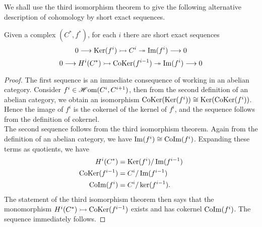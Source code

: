 \documentclass[a4paper]{article}
\def\mono{\rightarrowtail}
\def\epi{\twoheadrightarrow}
\begin{document}
We shall use the third isomorphism theorem to give the following alternative description of cohomology by short exact sequences.
\begin{Theorem}
    Given a complex $(C^*, f^*)$, for each $i$ there are short exact sequences
    \[
        0 \to \Ker(f^i) \mono C^{i} \epi \im(f^i) \to 0
    \]
    \begin{equation}\label{eqn:CoHomExact}
        0 \to H^i(C^*) \mono \CoKer(f^{i-1}) \epi \im(f^{i}) \to 0
    \end{equation}
\end{Theorem}
\begin{proof}
    The first sequence is an immediate consequence of working in an abelian category. Consider $f^i \in \operatorname{\mathscr{H}om}(C^{i}, C^{i+1})$, then from the second definition of an abelian category, we obtain an isomorphism $\operatorname{CoKer}(\operatorname{Ker}(f^i)) \cong \operatorname{Ker}(\operatorname{CoKer}(f^i))$. Hence the image of $f^i$ is the cokernel of the kernel of $f^i$, and the sequence follows from the definition of cokernel.\\
    The second sequence follows from the third isomorphism theorem. Again from the definition of an abelian category, we have $\operatorname{Im}(f^i) \cong \operatorname{CoIm}(f^i)$. Expanding these terms as quotients, we have
    \begin{align*}
        H^i(C^*) &= \operatorname{Ker}(f^i)/ \operatorname{Im}(f^{i-1}) \\
        \operatorname{CoKer}(f^{i-1}) &= C^i/\operatorname{Im}(f^{i-1}) \\
        \operatorname{CoIm}(f^i) &= C^i/\ker(f^{i-1}).
    \end{align*}
    The statement of the third isomorphism theorem then says that the monomorphism $H^i(C^*) \mono \CoKer(f^{i-1})$ exists and has cokernel $\operatorname{CoIm}(f^i)$. The sequence immediately follows.
\end{proof}
\end{document}
